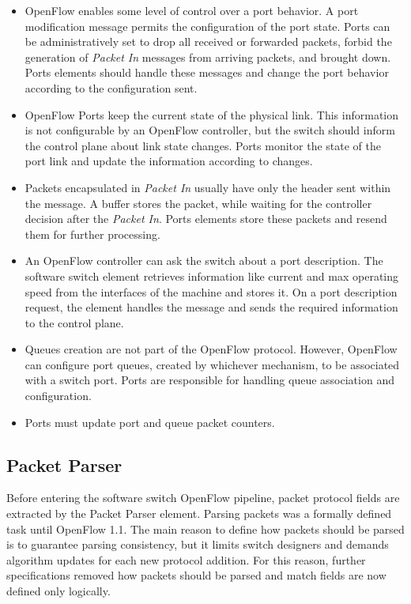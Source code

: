 	\begin{itemize}

	\item OpenFlow enables some level of control over a port behavior. A port modification message permits the configuration of the port state. Ports can be administratively set to drop all received or forwarded packets, forbid the generation of \textit{Packet In} messages from arriving packets, and brought down. Ports elements should handle these messages and change the port behavior according to the configuration sent.

	\item OpenFlow Ports keep the current state of the physical link. This information is not configurable by an OpenFlow controller, but the switch should inform the control plane about link state changes. Ports monitor the state of the port link and update the information according to changes.

	\item Packets encapsulated in \textit{Packet In} usually have only the header sent within the message. A buffer stores the packet, while waiting for the controller decision after the \textit{Packet In}. Ports elements store these packets and resend them for further processing.

	\item An OpenFlow controller can ask the switch about a port description. The software switch element retrieves information like current and max operating speed from the interfaces of the machine and stores it. On a port description request, the element handles the message and sends the required information to the control plane.

	\item Queues creation are not part of the OpenFlow protocol. However, OpenFlow can configure port queues, created by whichever mechanism, to be associated with a switch port. Ports are responsible for handling queue association and configuration.  

	\item Ports must update port and queue packet counters.           
	\end{itemize}

	\subsection{Packet Parser}

	Before entering the software switch OpenFlow pipeline, packet protocol fields are extracted by the Packet Parser element. Parsing packets was a formally defined task until OpenFlow 1.1. The main reason to define how packets should be parsed is to guarantee parsing consistency, but it limits switch designers and demands algorithm updates for each new protocol addition. For this reason, further specifications removed how packets should be parsed and match fields are now defined only logically.

